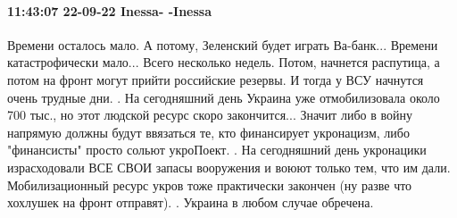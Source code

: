 \paragraph{11:43:07 22-09-22 Inessa- -Inessa}
Времени осталось мало.
А потому, Зеленский будет играть Ва-банк...
Времени катастрофически мало... Всего несколько недель. Потом, начнется распутица, а потом на фронт могут прийти российские резервы.
И тогда у ВСУ начнутся очень трудные дни.
.
На сегодняшний день Украина уже отмобилизовала около 700 тыс., но этот людской ресурс скоро закончится...
Значит либо в войну напрямую должны будут ввязаться те, кто финансирует укронацизм, либо "финансисты" просто сольют укроПоект.
.
На сегодняшний день укронацики израсходовали ВСЕ СВОИ запасы вооружения и воюют только тем, что им дали.
Мобилизационный ресурс укров тоже практически закончен (ну разве что хохлушек на фронт отправят).
.
Украина в любом случае обречена.

